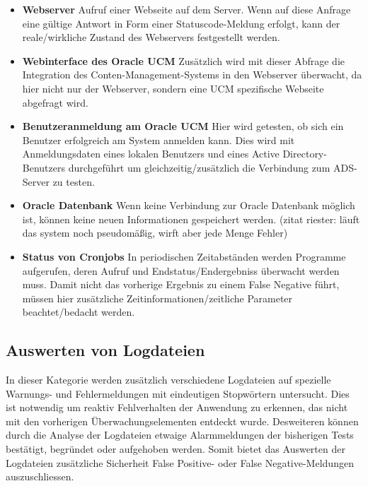 \begin{itemize}
\item \textbf{Webserver} Aufruf einer Webseite auf dem Server. Wenn auf diese Anfrage eine gültige Antwort in Form einer Statuscode-Meldung erfolgt, kann der reale/wirkliche Zustand des Webservers festgestellt werden.

\item \textbf{Webinterface des Oracle UCM} Zusätzlich wird mit dieser Abfrage die Integration des Conten-Management-Systems in den Webserver überwacht, da hier nicht nur der Webserver, sondern eine UCM spezifische Webseite abgefragt wird.

\item \textbf{Benutzeranmeldung am Oracle UCM} Hier wird getesten, ob sich ein Benutzer erfolgreich am System anmelden kann.
Dies wird mit Anmeldungsdaten eines lokalen Benutzers und eines Active Directory-Benutzers durchgeführt um gleichzeitig/zusätzlich die Verbindung zum ADS-Server zu testen.

\item \textbf{Oracle Datenbank} Wenn keine Verbindung zur Oracle Datenbank möglich ist, können keine neuen Informationen gespeichert werden. 
(zitat riester: läuft das system noch pseudomäßig, wirft aber jede Menge Fehler)

\item \textbf{Status von Cronjobs} In periodischen Zeitabständen werden Programme aufgerufen, deren Aufruf und Endstatus/Endergebniss überwacht werden muss. 
Damit nicht das vorherige Ergebnis zu einem False Negative führt, müssen hier zusätzliche Zeitinformationen/zeitliche Parameter beachtet/bedacht werden.
\end{itemize}

\subsection{Auswerten von Logdateien}
In dieser Kategorie werden zusätzlich verschiedene Logdateien auf spezielle Warnungs- und Fehlermeldungen mit eindeutigen Stopwörtern untersucht.
Dies ist notwendig um reaktiv Fehlverhalten der Anwendung zu erkennen, das nicht mit den vorherigen Überwachungselementen entdeckt wurde.
Desweiteren können durch die Analyse der Logdateien etwaige Alarmmeldungen der bisherigen Tests bestätigt, begründet oder aufgehoben werden.
Somit bietet das Auswerten der Logdateien zusätzliche Sicherheit False Positive- oder False Negative-Meldungen auszuschliessen.

